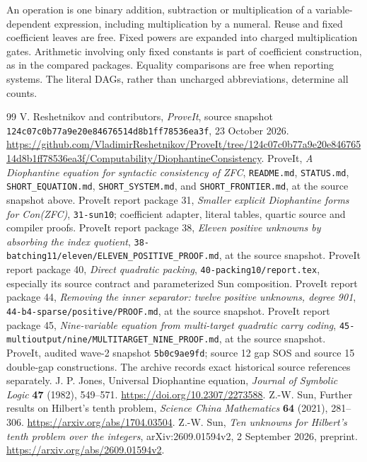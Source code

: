 \documentclass[11pt]{article}
\theoremstyle{remark}\newtheorem{remark}[theorem]{Remark}
\newcommand{\pin}{\texttt{124c07c0b77a9e20e84676514d8b1ff78536ea3f}}
\begin{document}
An operation is one binary addition, subtraction or multiplication of a
variable-dependent expression, including multiplication by a numeral.
Reuse and fixed coefficient leaves are free. Fixed powers are expanded
into charged multiplication gates. Arithmetic involving only fixed
constants is part of coefficient construction, as in the compared
packages. Equality comparisons are free when reporting systems. The
literal DAGs, rather than uncharged abbreviations, determine all counts.







\appendix


\begingroup\raggedright
\begin{thebibliography}{99}
 V. Reshetnikov and contributors, \emph{ProveIt}, source snapshot
\pin, 23 October 2026.
\url{https://github.com/VladimirReshetnikov/ProveIt/tree/124c07c0b77a9e20e84676514d8b1ff78536ea3f/Computability/DiophantineConsistency}.
 ProveIt, \emph{A Diophantine equation for syntactic consistency of ZFC},
\texttt{README.md}, \texttt{STATUS.md}, \texttt{SHORT\_EQUATION.md},
\texttt{SHORT\_SYSTEM.md}, and \texttt{SHORT\_FRONTIER.md}, at the source snapshot above.
 ProveIt report package 31, \emph{Smaller explicit Diophantine forms for Con(ZFC)},
\texttt{31-sun10}; coefficient adapter, literal tables, quartic source and compiler proofs.
 ProveIt report package 38, \emph{Eleven positive unknowns by absorbing the index quotient},
\texttt{38-batching11/eleven/ELEVEN\_POSITIVE\_PROOF.md}, at the source snapshot.
 ProveIt report package 40, \emph{Direct quadratic packing},
\texttt{40-packing10/report.tex}, especially its source contract and parameterized Sun composition.
 ProveIt report package 44, \emph{Removing the inner separator: twelve positive unknowns, degree 901},
\texttt{44-b4-sparse/positive/PROOF.md}, at the source snapshot.
 ProveIt report package 45, \emph{Nine-variable equation from multi-target quadratic carry coding},
\texttt{45-multioutput/nine/MULTITARGET\_NINE\_PROOF.md}, at the source snapshot.
 ProveIt, audited wave-2 snapshot
\texttt{5b0c9ae9fd}; source 12 gap SOS and source 15 double-gap constructions.
The archive records exact historical source references separately.
 J. P. Jones, Universal Diophantine equation,
\emph{Journal of Symbolic Logic} \textbf{47} (1982), 549--571.
\url{https://doi.org/10.2307/2273588}.
 Z.-W. Sun, Further results on Hilbert's tenth problem,
\emph{Science China Mathematics} \textbf{64} (2021), 281--306.
\url{https://arxiv.org/abs/1704.03504}.
 Z.-W. Sun, \emph{Ten unknowns for Hilbert's tenth problem over the integers},
arXiv:2609.01594v2, 2 September 2026, preprint.
\url{https://arxiv.org/abs/2609.01594v2}.
\end{thebibliography}
\endgroup
\end{document}
